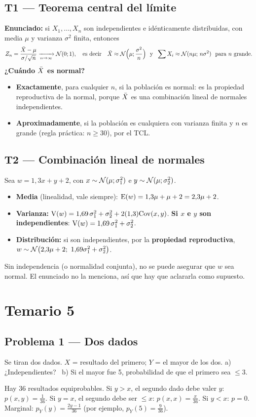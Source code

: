 \subsection{T1 --- Teorema central del límite}
\textbf{Enunciado:} si $X_1,\dots,X_n$ son independientes e idénticamente distribuidas, con media $\mu$ y varianza $\sigma^2$ finita, entonces
\[
Z_n=\frac{\Xb-\mu}{\sigma/\sqrt n}\xrightarrow[n\to\infty]{}\Nor(0;1),\quad\text{es decir}\quad\Xb\approx\Nor\Big(\mu;\frac{\sigma^2}{n}\Big)\ \text{ y }\ \sum X_i\approx\Nor(n\mu;\,n\sigma^2)\ \text{ para }n\text{ grande}.
\]
\textbf{¿Cuándo $\bar{X}$ es normal?}
\begin{itemize}
\item \textbf{Exactamente}, para cualquier $n$, si la población es normal: es la propiedad reproductiva de la normal, porque $\bar{X}$ es una combinación lineal de normales independientes.
\item \textbf{Aproximadamente}, si la población es cualquiera con varianza finita y $n$ es grande (regla práctica: $n\ge30$), por el TCL.
\end{itemize}

\subsection{T2 --- Combinación lineal de normales}
Sea $w=1{,}3x+y+2$, con $x\sim\mathcal{N}(\mu;\sigma_1^2)$ e $y\sim\mathcal{N}(\mu;\sigma_2^2)$.
\begin{itemize}
\item \textbf{Media} (linealidad, vale siempre): $\mathrm{E}(w)=1{,}3\mu+\mu+2=2{,}3\mu+2$.
\item \textbf{Varianza:} $\mathrm{V}(w)=1{,}69\,\sigma_1^2+\sigma_2^2+2(1{,}3)\mathrm{Cov}(x,y)$. \textbf{Si $x$ e $y$ son independientes}: $\mathrm{V}(w)=1{,}69\,\sigma_1^2+\sigma_2^2$.
\item \textbf{Distribución:} si son independientes, por la \textbf{propiedad reproductiva}, $w\sim\Nor\big(2{,}3\mu+2;\ 1{,}69\sigma_1^2+\sigma_2^2\big)$.
\end{itemize}
Sin independencia (o normalidad conjunta), no se puede asegurar que $w$ sea normal. El enunciado no la menciona, así que hay que aclararla como supuesto.

\newpage
\section{Temario 5}

\subsection{Problema 1 --- Dos dados}
\begin{enun}
Se tiran dos dados. $X$ = resultado del primero; $Y$ = el mayor de los dos. a) ¿Independientes? \ b) Si el mayor fue 5, probabilidad de que el primero sea $\le3$.
\end{enun}
 Hay 36 resultados equiprobables. Si $y>x$, el segundo dado debe valer $y$: $p(x,y)=\frac1{36}$. Si $y=x$, el segundo debe ser $\le x$: $p(x,x)=\frac{x}{36}$. Si $y<x$: $p=0$.
Marginal: $p_Y(y)=\frac{2y-1}{36}$ (por ejemplo, $p_Y(5)=\frac9{36}$).

